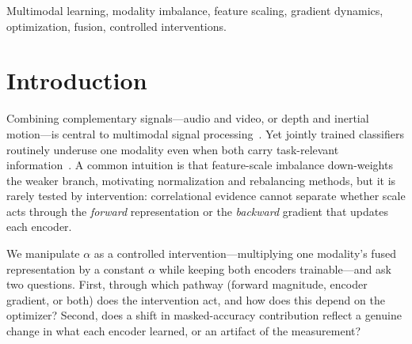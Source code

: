\documentclass[conference]{IEEEtran}
\begin{document}
\begin{IEEEkeywords}
Multimodal learning, modality imbalance, feature scaling, gradient dynamics, optimization, fusion, controlled interventions.
\end{IEEEkeywords}

\section{Introduction}
Combining complementary signals---audio and video, or depth and inertial motion---is central to multimodal signal processing~\cite{ramachandram2017deep,baltrusaitis2019multimodal}. Yet jointly trained classifiers routinely underuse one modality even when both carry task-relevant information~\cite{wang2020what,peng2022balanced,huang2022modality}. A common intuition is that feature-scale imbalance down-weights the weaker branch, motivating normalization and rebalancing methods, but it is rarely tested by intervention: correlational evidence cannot separate whether scale acts through the \emph{forward} representation or the \emph{backward} gradient that updates each encoder.

We manipulate $\alpha$ as a controlled intervention---multiplying one modality's fused representation by a constant $\alpha$ while keeping both encoders trainable---and ask two questions. First, through which pathway (forward magnitude, encoder gradient, or both) does the intervention act, and how does this depend on the optimizer? Second, does a shift in masked-accuracy contribution reflect a genuine change in what each encoder learned, or an artifact of the measurement?
\end{document}
